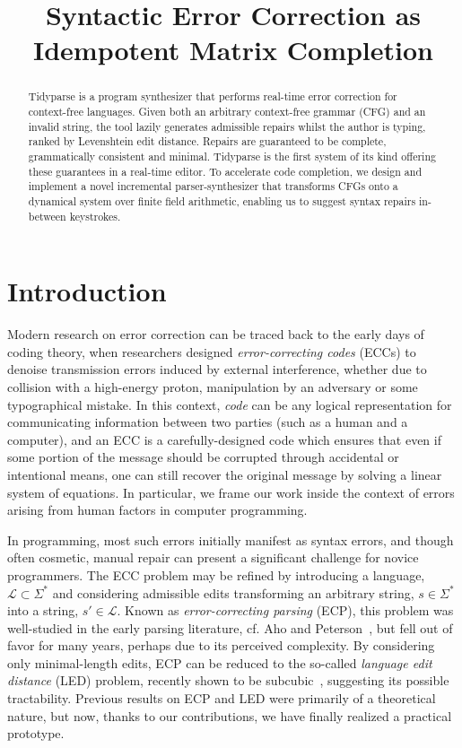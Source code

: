 \documentclass[sigplan,review,anonymous,acmsmall]{acmart}\settopmatter{printfolios=false,printccs=false,printacmref=false}
\begin{document}
    \title{Syntactic Error Correction as Idempotent Matrix Completion}
    \begin{abstract}
        Tidyparse is a program synthesizer that performs real-time error correction for context-free languages.
        Given both an arbitrary context-free grammar (CFG) and an invalid string, the tool lazily generates admissible repairs whilst the author is typing, ranked by Levenshtein edit distance. Repairs are guaranteed to be complete, grammatically consistent and minimal.
        Tidyparse is the first system of its kind offering these guarantees in a real-time editor. To accelerate code completion, we design and implement a novel incremental parser-synthesizer that transforms CFGs onto a dynamical system over finite field arithmetic, enabling us to suggest syntax repairs in-between keystrokes.
    \end{abstract}


    \maketitle

    \section{Introduction}

    Modern research on error correction can be traced back to the early days of coding theory, when researchers designed \textit{error-correcting codes} (ECCs) to denoise transmission errors induced by external interference, whether due to collision with a high-energy proton, manipulation by an adversary or some typographical mistake. In this context, \textit{code} can be any logical representation for communicating information between two parties (such as a human and a computer), and an ECC is a carefully-designed code which ensures that even if some portion of the message should be corrupted through accidental or intentional means, one can still recover the original message by solving a linear system of equations. In particular, we frame our work inside the context of errors arising from human factors in computer programming.

    In programming, most such errors initially manifest as syntax errors, and though often cosmetic, manual repair can present a significant challenge for novice programmers. The ECC problem may be refined by introducing a language, $\mathcal{L} \subset \Sigma^*$ and considering admissible edits transforming an arbitrary string, $s \in \Sigma^*$ into a string, $s'\in\mathcal{L}$. Known as \textit{error-correcting parsing} (ECP), this problem was well-studied in the early parsing literature, cf. Aho and Peterson~\cite{aho1972minimum}, but fell out of favor for many years, perhaps due to its perceived complexity. By considering only minimal-length edits, ECP can be reduced to the so-called \textit{language edit distance} (LED) problem, recently shown to be subcubic~\cite{bringmann2019truly}, suggesting its possible tractability. Previous results on ECP and LED were primarily of a theoretical nature, but now, thanks to our contributions, we have finally realized a practical prototype.
\end{document}
